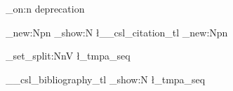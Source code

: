 \usepackage[enable-debug,check-declarations]{expl3}

\ExplSyntaxOn
\debug_on:n { deprecation }

\cs_new:Npn \showcitation
  { \tl_show:N \l__csl_citation_tl }
\cs_new:Npn \showbibliography
  {
    \seq_set_split:NnV \l_tmpa_seq { \par } \g__csl_bibliography_tl
    \seq_show:N \l_tmpa_seq
  }

\ExplSyntaxOff


\pagestyle{empty}
\setlength{\parindent}{0pt}
